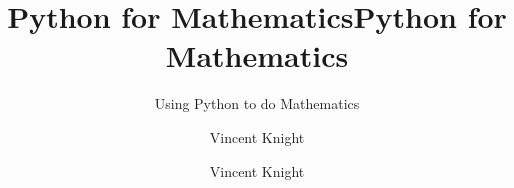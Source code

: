 \documentclass[Alon2,singlecolor,11pt]{Alon}%
\title{Python for Mathematics}
\author{Vincent Knight}
\begin{document}
\frontmatter





\title{Python for Mathematics} %
\subtitle{Using Python to do Mathematics}


\author{Vincent Knight}%


\maketitle


\cleardoublepage
\setcounter{page}{7} %

\listoffigures
\listoftables





\mainmatter



% 


% 
% 

\printindex
\cleardoublepage
\end{document}
